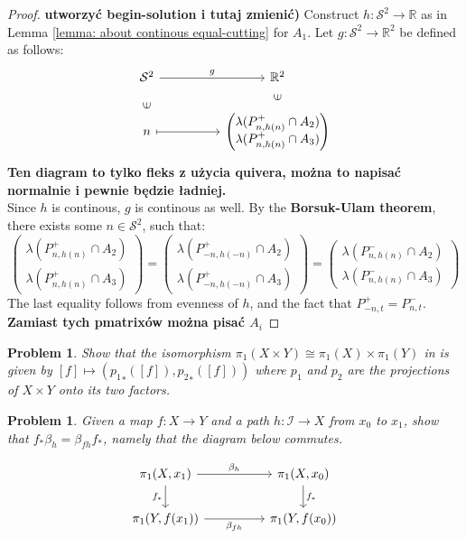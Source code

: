 \documentclass[11pt, a4paper, final]{amsart}
\newcommand{\R}{{\mathbb{R}}}
\newcommand\todo[1]{\textbf{\textcolor{redd}{#1}}}
\newcommand{\unit}{\mathcal{I}}
\newcommand{\sphere}{\mathcal{S}}
\numberwithin{theorem}{section}
\newtheorem{problem}[theorem]{Problem}
\theoremstyle{definition}
\theoremstyle{remark}
\begin{document}
\begin{proof}\todo{utworzyć begin-solution i tutaj zmienić)}
    Construct $h : \sphere^2 \to \R$ as in Lemma \ref{lemma: about continous equal-cutting} for $A_1$.
    Let $g : \sphere^2 \to \R^2$ be defined as follows:
    \[\begin{tikzcd}
	{\sphere^2} && {\R^2} \\
	n && {\begin{pmatrix}
	    \lambda(P^+_{n, h(n)} \cap A_2) \\
        \lambda(P^+_{n, h(n)} \cap A_3)
	\end{pmatrix}}
	\arrow["g", from=1-1, to=1-3]
	\arrow["\in"{marking, allow upside down}, draw=none, from=2-1, to=1-1]
	\arrow[maps to, from=2-1, to=2-3]
	\arrow["\in"{marking, allow upside down}, draw=none, from=2-3, to=1-3]
\end{tikzcd}\]
\todo{Ten diagram to tylko fleks z użycia quivera, można to napisać normalnie i pewnie będzie ładniej.} \\
Since $h$ is continous, $g$ is continous as well. By the \textbf{Borsuk-Ulam theorem}, there exists some $n \in \sphere^2$, such that:
$$\begin{pmatrix}
	    \lambda(P^+_{n, h(n)} \cap A_2) \\
        \lambda(P^+_{n, h(n)} \cap A_3)
	\end{pmatrix} = \begin{pmatrix}
	    \lambda(P^+_{-n, h(-n)} \cap A_2) \\
        \lambda(P^+_{-n, h(-n)} \cap A_3)
	\end{pmatrix} = \begin{pmatrix}
	    \lambda(P^-_{n, h(n)} \cap A_2) \\
        \lambda(P^-_{n, h(n)} \cap A_3)
	\end{pmatrix}$$
    The last equality follows from evenness of $h$, and the fact that $P^+_{-n, t} = P^-_{n, t}$.
    \todo{Zamiast tych pmatrixów można pisać $A_i$}
\end{proof}

\begin{problem}\label{problem: 1.1.14}
    Show that the isomorphism $\pi_1(X \times Y) \cong \pi_1(X) \times \pi_1(Y)$ in \cite[Proposition 1.12]{AH} is given by $[f] \mapsto ({p_1}_*([f]), {p_2}_*([f]))$ where $p_1$ and $p_2$ are the projections of $X \times Y$ onto its two factors.
\end{problem}

\begin{problem}\label{problem: 1.1.15}
    Given a map $f:X \rightarrow Y$ and a path $h : \unit \rightarrow X$ from $x_0$ to $x_1$, show that $f_*\beta_h = \beta_{fh}f_*$, namely that the diagram below commutes.

    \[\begin{tikzcd}
	{\pi_1(X, x_1)} && {\pi_1(X, x_0)} \\
	{\pi_1(Y, f(x_1))} && {\pi_1(Y, f(x_0))}
	\arrow["{\beta_h}", from=1-1, to=1-3]
	\arrow["{f_*}"', from=1-1, to=2-1]
	\arrow["{f_*}", from=1-3, to=2-3]
	\arrow["{\beta_{fh}}"', from=2-1, to=2-3]
\end{tikzcd}\]
\end{problem}
\end{document}
